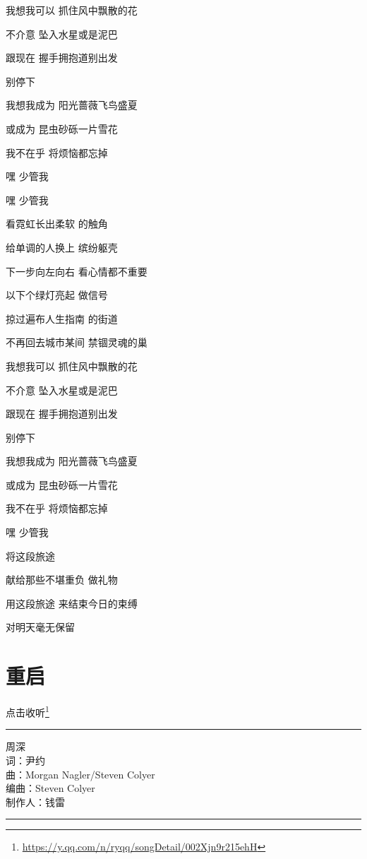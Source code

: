 \documentclass[]{ctexbook}
\renewcommand{\href}[2]{#2\footnote{\url{#1}}}
\begin{document}
我想我可以 抓住风中飘散的花

不介意 坠入水星或是泥巴

跟现在 握手拥抱道别出发

别停下

我想我成为 阳光蔷薇飞鸟盛夏

或成为 昆虫砂砾一片雪花

我不在乎 将烦恼都忘掉

嘿 少管我

嘿 少管我

看霓虹长出柔软 的触角

给单调的人换上 缤纷躯壳

下一步向左向右 看心情都不重要

以下个绿灯亮起 做信号

掠过遍布人生指南 的街道

不再回去城市某间 禁锢灵魂的巢

我想我可以 抓住风中飘散的花

不介意 坠入水星或是泥巴

跟现在 握手拥抱道别出发

别停下

我想我成为 阳光蔷薇飞鸟盛夏

或成为 昆虫砂砾一片雪花

我不在乎 将烦恼都忘掉

嘿 少管我

将这段旅途

献给那些不堪重负 做礼物

用这段旅途 来结束今日的束缚

对明天毫无保留

\section*{重启}\label{restart}


\href{https://y.qq.com/n/ryqq/songDetail/002Xjn9r215ehH}{点击收听}

\begin{center}\rule{0.5\linewidth}{0.5pt}\end{center}

周深\\
词：尹约\\
曲：Morgan Nagler/Steven Colyer\\
编曲：Steven Colyer\\
制作人：钱雷

\begin{center}\rule{0.5\linewidth}{0.5pt}\end{center}
\end{document}
